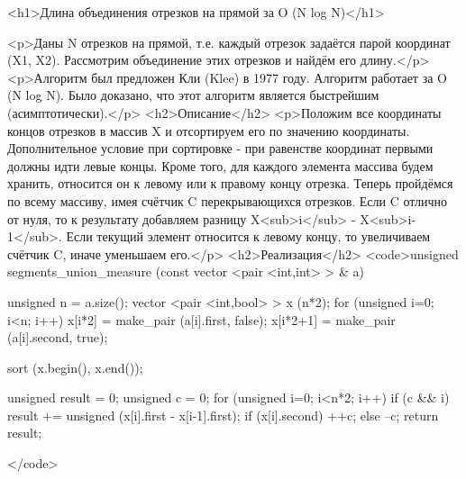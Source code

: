 <h1>Длина объединения отрезков на прямой за O (N log N)</h1>

<p>Даны N отрезков на прямой, т.е. каждый отрезок задаётся парой координат (X1, X2). Рассмотрим объединение этих отрезков и найдём его длину.</p>
<p>Алгоритм был предложен Кли (Klee) в 1977 году. Алгоритм работает за O (N log N). Было доказано, что этот алгоритм является быстрейшим (асимптотически).</p>
<h2>Описание</h2>
<p>Положим все координаты концов отрезков в массив X и отсортируем его по значению координаты. Дополнительное условие при сортировке - при равенстве координат первыми должны идти левые концы. Кроме того, для каждого элемента массива будем хранить, относится он к левому или к правому концу отрезка. Теперь пройдёмся по всему массиву, имея счётчик C перекрывающихся отрезков. Если C отлично от нуля, то к результату добавляем разницу X<sub>i</sub> - X<sub>i-1</sub>. Если текущий элемент относится к левому концу, то увеличиваем счётчик C, иначе уменьшаем его.</p>
<h2>Реализация</h2>
<code>unsigned segments_union_measure (const vector <pair <int,int> > & a)
{
	unsigned n = a.size();
	vector <pair <int,bool> > x (n*2);
	for (unsigned i=0; i<n; i++)
	{
		x[i*2] = make_pair (a[i].first, false);
		x[i*2+1] = make_pair (a[i].second, true);
	}

	sort (x.begin(), x.end());

	unsigned result = 0;
	unsigned c = 0;
	for (unsigned i=0; i<n*2; i++)
	{
		if (c && i)
			result += unsigned (x[i].first - x[i-1].first);
		if (x[i].second)
			++c;
		else
			--c;
	}
	return result;
}</code>